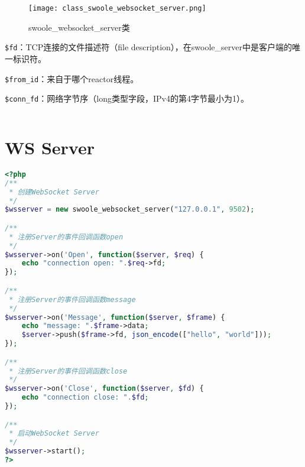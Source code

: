 \begin{figure}[htbp]
\centering
\texttt{[image: class\_swoole\_websocket\_server.png]}
\caption{swoole\_websocket\_server类}
\end{figure}

\begin{compactitem}
\item \texttt{\$fd}：TCP连接的文件描述符（file description），在swoole\_server中是客户端的唯一标识符。
\item \texttt{\$from\_id}：来自于哪个reactor线程。
\item \texttt{\$conn\_fd}：网络字节序（long类型字段，IPv4的第4字节最小为1）。
\end{compactitem}


\begin{lstlisting}[language=PHP]

\end{lstlisting}


\section{WS Server}


\begin{lstlisting}[language=PHP]
<?php
/**
 * 创建WebSocket Server
 */
$wsserver = new swoole_websocket_server("127.0.0.1", 9502);

/**
 * 注册Server的事件回调函数open
 */
$wsserver->on('Open', function($server, $req) {
    echo "connection open: ".$req->fd;
});

/**
 * 注册Server的事件回调函数message
 */
$wsserver->on('Message', function($server, $frame) {
    echo "message: ".$frame->data;
    $server->push($frame->fd, json_encode(["hello", "world"]));
});

/**
 * 注册Server的事件回调函数close
 */
$wsserver->on('Close', function($server, $fd) {
    echo "connection close: ".$fd;
});

/**
 * 启动WebSocket Server
 */
$wsserver->start();
?>
\end{lstlisting}




\begin{lstlisting}[language=PHP]

\end{lstlisting}



\begin{lstlisting}[language=PHP]

\end{lstlisting}


